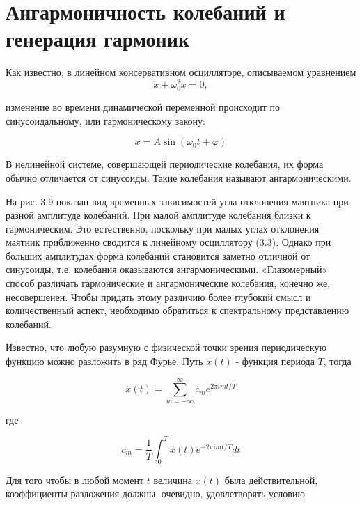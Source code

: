 \documentclass[10pt]{article}
\begin{document}
\section*{Ангармоничность колебаний и генерация гармоник}

Как известно, в линейном консервативном осцилляторе, описываемом уравнением
\begin{equation}
\ddot{x} + \omega_0^2 x = 0, \tag{3.3}
\end{equation}

изменение во времени динамической переменной происходит по синусоидальному, или гармоническому закону:


\begin{equation*}
x=A \sin \left(\omega_{0} t+\varphi\right) \tag{3.4}
\end{equation*}


В нелинейной системе, совершающей периодические колебания, их форма обычно отличается от синусоиды. Такие колебания называют ангармоническими.

На рис. 3.9 показан вид временных зависимостей угла отклонения маятника при разной амплитуде колебаний. При малой амплитуде колебания близки к гармоническим. Это естественно, поскольку при малых углах отклонения маятник приближенно сводится к линейному осциллятору (3.3). Однако при больших амплитудах форма колебаний становится заметно отличной от синусоиды, т.е. колебания оказываются ангармоническими. «Глазомерный» способ различать гармонические и ангармонические колебания, конечно же, несовершенен. Чтобы придать этому различию более глубокий смысл и количественный аспект, необходимо обратиться к спектральному представлению колебаний.

Известно, что любую разумную с физической точки зрения периодическую функцию можно разложить в ряд Фурье. Путь $x(t)$ - функция периода $T$, тогда


\begin{equation*}
x(t)=\sum_{m=-\infty}^{\infty} c_{m} e^{2 \pi i m t / T} \tag{3.5}
\end{equation*}


где


\begin{equation*}
c_{m}=\frac{1}{T} \int_{0}^{T} x(t) e^{-2 \pi i m t / T} d t \tag{3.6}
\end{equation*}


Для того чтобы в любой момент $t$ величина $x(t)$ была действительной, коэффициенты разложения должны, очевидно, удовлетворять условию
\end{document}
